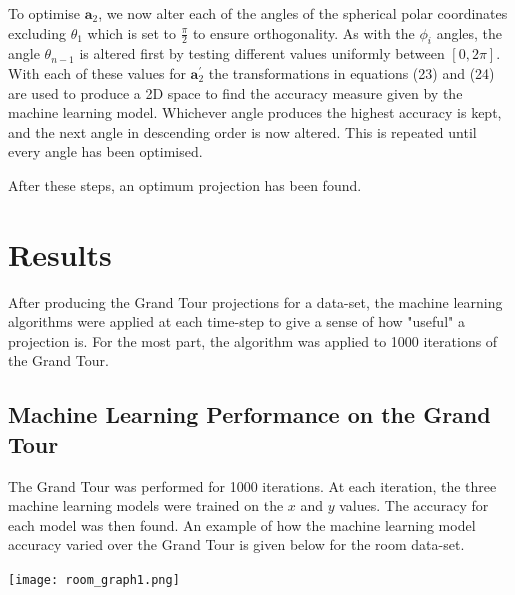 \documentclass[a4paper,11pt,twoside]{article}
\begin{document}
To optimise $\bm{a}_2$, we now alter each of the angles of the spherical polar coordinates excluding $\theta_1$ which is set to $\frac{\pi}{2}$ to ensure orthogonality. As with the $\phi_i$ angles, the angle $\theta_{n-1}$ is altered first by testing different values uniformly between $[0, 2\pi]$. With each of these values for $\bm{a}_2^{\prime}$ the transformations in equations (23) and (24) are used to produce a 2D space to find the accuracy measure given by the machine learning model. Whichever angle produces the highest accuracy is kept, and the next angle in descending order is now altered. This is repeated until every angle has been optimised.
\newline

After these steps, an optimum projection has been found.
\newpage
\section{Results}

After producing the Grand Tour projections for a data-set, the machine learning algorithms were applied at each time-step to give a sense of how "useful" a projection is. For the most part, the algorithm was applied to 1000 iterations of the Grand Tour.
\subsection{Machine Learning Performance on the Grand Tour}

The Grand Tour was performed for 1000 iterations. At each iteration, the three machine learning models were trained on the $x$ and $y$ values. The accuracy for each model was then found. An example of how the machine learning model accuracy varied over the Grand Tour is given below for the room data-set.
\begin{center}
\texttt{[image: room\_graph1.png]}

\end{center}
\end{document}
